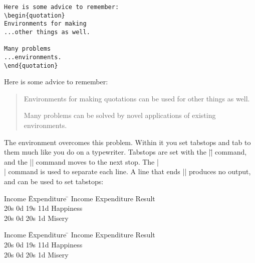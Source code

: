 \newenvironment{egbox}%
{\begin{minipage}[t]{\egwidth}}%
{\end{minipage}}

\newcommand{\egstart}{\begin{ega}\begin{egbox}}
\newcommand{\egmid}{\end{egbox}\hfill\begin{egbox}}
\newcommand{\egend}{\end{egbox}\end{ega}}


\newcommand{\fn}[1]{\hbox{\tt #1}}
\newcommand{\llo}[1]{(see line #1)}
\newcommand{\lls}[1]{(see lines #1)}


\egstart
\begin{verbatim}
Here is some advice to remember:
\begin{quotation}
Environments for making
...other things as well.

Many problems
...environments.
\end{quotation}
\end{verbatim}
\egmid%
Here is some advice to remember:
\begin{quotation}
Environments for making quotations
can be used for other things as well.

Many problems can be solved by
novel applications of existing
environments.
\end{quotation}
\egend

The  environment overcomes this problem. Within it you set
tabstops and tab to them much like you do on a typewriter.  Tabstops are
set with the |\=| command, and the |\>| command moves to the
next stop.  The
|\\| command is used to separate each line.  A line that ends |\kill|
produces no output, and can be used to set tabstops:


\begin{teX}
\begin{tabbing}
 Income \=Expenditure \= \kill
 Income \>Expenditure \>Result\\
 20s 0d  \>19s 11d \>Happiness\\
 20s 0d  \>20s 1d  \>Misery \\
\end{tabbing}
\end{teX}

\smallskip

\begin{tabbing}
Income \=Expenditure \=    \kill
Income \>Expenditure \>Result \\
20s 0d \>19s 11d \>Happiness   \\
20s 0d \>20s 1d  \>Misery    \\
\end{tabbing}


